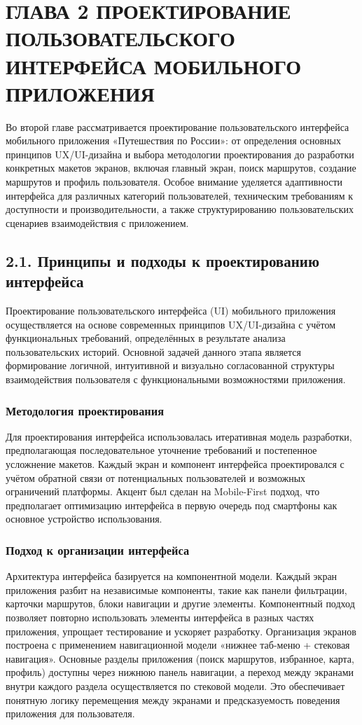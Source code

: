 \section{ГЛАВА 2 ПРОЕКТИРОВАНИЕ ПОЛЬЗОВАТЕЛЬСКОГО ИНТЕРФЕЙСА МОБИЛЬНОГО ПРИЛОЖЕНИЯ}

Во второй главе рассматривается проектирование пользовательского интерфейса мобильного приложения «Путешествия по России»: от определения основных принципов UX/UI-дизайна и выбора методологии проектирования до разработки конкретных макетов экранов, включая главный экран, поиск маршрутов, создание маршрутов и профиль пользователя. Особое внимание уделяется адаптивности интерфейса для различных категорий пользователей, техническим требованиям к доступности и производительности, а также структурированию пользовательских сценариев взаимодействия с приложением.

\subsection*{2.1. Принципы и подходы к проектированию интерфейса}
Проектирование пользовательского интерфейса (UI) мобильного приложения осуществляется на основе современных принципов UX/UI-дизайна с учётом функциональных требований, определённых в результате анализа пользовательских историй. Основной задачей данного этапа является формирование логичной, интуитивной и визуально согласованной структуры взаимодействия пользователя с функциональными возможностями приложения.

\subsubsection*{Методология проектирования}
Для проектирования интерфейса использовалась итеративная модель разработки, предполагающая последовательное уточнение требований и постепенное усложнение макетов. Каждый экран и компонент интерфейса проектировался с учётом обратной связи от потенциальных пользователей и возможных ограничений платформы. Акцент был сделан на Mobile-First подход, что предполагает оптимизацию интерфейса в первую очередь под смартфоны как основное устройство использования.

\subsubsection*{Подход к организации интерфейса}
Архитектура интерфейса базируется на компонентной модели. Каждый экран приложения разбит на независимые компоненты, такие как панели фильтрации, карточки маршрутов, блоки навигации и другие элементы. Компонентный подход позволяет повторно использовать элементы интерфейса в разных частях приложения, упрощает тестирование и ускоряет разработку.
Организация экранов построена с применением навигационной модели «нижнее таб-меню + стековая навигация». Основные разделы приложения (поиск маршрутов, избранное, карта, профиль) доступны через нижнюю панель навигации, а переход между экранами внутри каждого раздела осуществляется по стековой модели. Это обеспечивает понятную логику перемещения между экранами и предсказуемость поведения приложения для пользователя.

